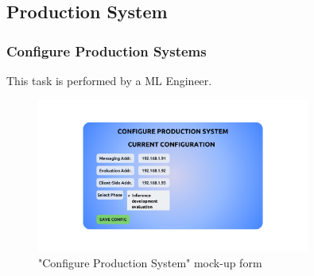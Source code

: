 \subsection{Production System}

\subsubsection{Configure Production Systems}

This task is performed by a ML Engineer.

\begin{figure}[H]
\centering
\includegraphics[width=0.8\textwidth]{figures/ui_configure_production.png}
\caption{"Configure Production System" mock-up form}
\end{figure}

